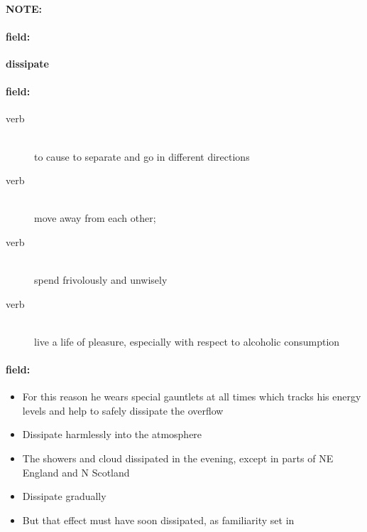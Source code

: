 \documentclass[12pt]{article}
\newenvironment{note}{\paragraph{NOTE:}}{}
\newenvironment{field}{\paragraph{field:}}{}
\begin{document}
\begin{note}
\begin{field}
\textbf{\large dissipate}
\end{field}


\begin{field}
\begin{description}
\item[verb] \hfill \\ 
to cause to separate and go in different directions

\item[verb] \hfill \\ 
move away from each other; 

\item[verb] \hfill \\ 
spend frivolously and unwisely

\item[verb] \hfill \\ 
live a life of pleasure, especially with respect to alcoholic consumption

\end{description}
\end{field}

\begin{field}
\begin{itemize}
\item For this reason he wears special gauntlets at all times which tracks his energy levels and help to safely dissipate the overflow
\item Dissipate harmlessly into the atmosphere
\item The showers and cloud dissipated in the evening, except in parts of NE England and N Scotland
\item Dissipate gradually
\item But that effect must have soon dissipated, as familiarity set in
\end{itemize}
\end{field}
\end{note}
\end{document}
